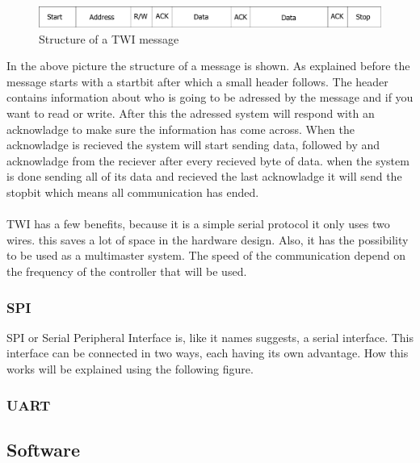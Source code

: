 \documentclass[10pt,a4paper]{article}
\begin{document}
\begin{figure}[H]
        \centering
        \graphicspath{ {./images/} }
        \includegraphics[scale=.6]{TWImessage}
        \caption{Structure of a TWI message}
        \label{fig:TWIstructure}
\end{figure}
In the above picture the structure of a message is shown. As explained before the message starts with a startbit after which a small header follows. The header contains information about who is going to be adressed by the message and if you want to read or write. After this the adressed system will respond with an acknowladge to make sure the information has come across. When the acknowladge is recieved the system will start sending data, followed by and acknowladge from the reciever after every recieved byte of data. when the system is done sending all of its data and recieved the last acknowladge it will send the stopbit which means all communication has ended.
\\
\\
TWI has a few benefits, because it is a simple serial protocol it only uses two wires. this saves a lot of space in the hardware design. Also, it has the possibility to be used as a multimaster system.
The speed of the communication depend on the frequency of the controller that will be used.


\subsubsection{SPI}
SPI or Serial Peripheral Interface is, like it names suggests, a serial interface. This interface can be connected in two ways, each having its own advantage. How this works will be explained using the following figure.

\subsubsection{UART}
\subsection{Software}
\end{document}
